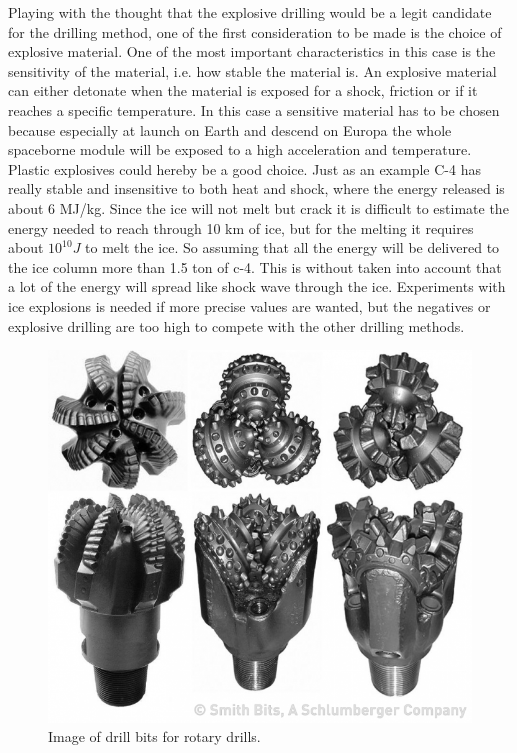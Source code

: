 \noindent
Playing with the thought that the explosive drilling would be a legit candidate for the drilling method, one of the first consideration to be made is the choice of explosive material. One of the most important characteristics in this case is the sensitivity of the material, i.e. how stable the material is. An explosive material can either detonate when the material is exposed for a shock, friction or if it reaches a specific temperature. In this case a sensitive material has to be chosen because especially at launch on Earth and descend on Europa the whole spaceborne module will be exposed to a high acceleration and temperature. Plastic explosives could hereby be a good choice. Just as an example C-4 has really stable and insensitive to both heat and shock, where the energy released is about 6 MJ/kg. Since the ice will not melt but crack it is difficult to estimate the energy needed to reach through 10 km of ice, but for the melting it requires about $10^{10}J$ to melt the ice. So assuming that all the energy will be delivered to the ice column more than 1.5 ton of c-4. This is without taken into account that a lot of the energy will spread like shock wave through the ice. Experiments with ice explosions is needed if more precise values are wanted, but the negatives or explosive drilling are too high to compete with the other drilling methods.

\begin{figure}[htb]
\begin{center}
\includegraphics[scale=0.4]{figures/RCS/drill_bit}
\caption{Image of drill bits for rotary drills.}
\label{fig:drill_bit}
\end{center}
\end{figure}

